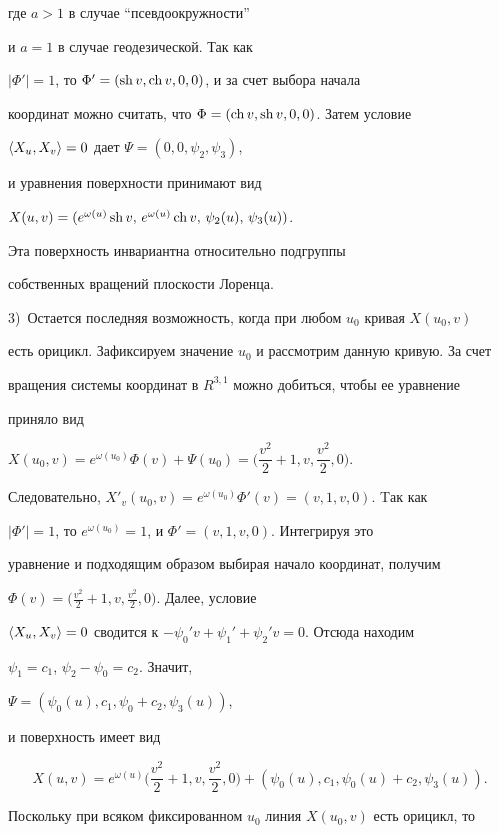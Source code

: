 \begin{pf}
где $a>1$ в случае ``псевдоокружности''


и $a=1$ в случае геодезической. Так как


$|\Phi '|=1$, то $\Phi '=(\operatorname{sh} v,\operatorname{ch} v,0,0)$, и за счет выбора начала


координат можно считать, что $\Phi =(\operatorname{ch} v,\operatorname{sh} v,0,0)$. Затем условие


$\langle X_u,X_v\rangle=0$ дает $\Psi=(0,0,\psi_2,\psi_3)$,


и уравнения поверхности принимают вид


$X(u,v)=(e^{\omega (u)}\sh v,\,e^{\omega (u)}\ch v,\,


\psi_2(u),\,\psi_3(u))$.


Эта поверхность инвариантна относительно подгруппы


собственных вращений плоскости Лоренца.


3)~Остается последняя возможность, когда при любом $u_0$ кривая $X(u_0,v)$


есть орицикл. Зафиксируем значение $u_0$ и рассмотрим данную кривую. За счет


вращения системы координат в $R^{3,1}$ можно добиться, чтобы ее уравнение


приняло вид


$X(u_0,v)=e^{\omega (u_0)}\Phi (v)+\Psi (u_0)=


\big(\dfrac{v^2}{2}+1,v,\dfrac{v^2}{2},0\big)$.


Следовательно, $X'_v(u_0,v)=e^{\omega (u_0)}\Phi '(v)=(v,1,v,0)$. Tак как


$|\Phi '|=1$, то $e^{\omega (u_0)}=1$, и $\Phi '=(v,1,v,0)$. Интегрируя это


уравнение и подходящим образом выбирая начало координат, получим


$\Phi (v)=\big(\frac{v^2}{2}+1,v,\frac{v^2}{2},0\big)$. Далее, условие


$\langle X_u,X_v\rangle=0$ сводится к $-\psi_0'v+\psi_1'+\psi_2'v=0$. Отсюда находим


$\psi_1=c_1$, $\psi_2-\psi_0=c_2$. Значит,


$\Psi =(\psi_0(u),c_1,\psi_0+c_2,\psi_3(u))$,


и поверхность имеет вид


$$


X(u,v)=e^{\omega (u)}\bigg(\dfrac{v^2}{2}+1,v,\dfrac{v^2}{2},0\bigg)+


(\psi_0(u),c_1,\psi_0(u)+c_2,\psi_3(u)).


$$


Поскольку при всяком фиксированном $u_0$ линия $X(u_0,v)$ есть орицикл, то



\end{pf}
